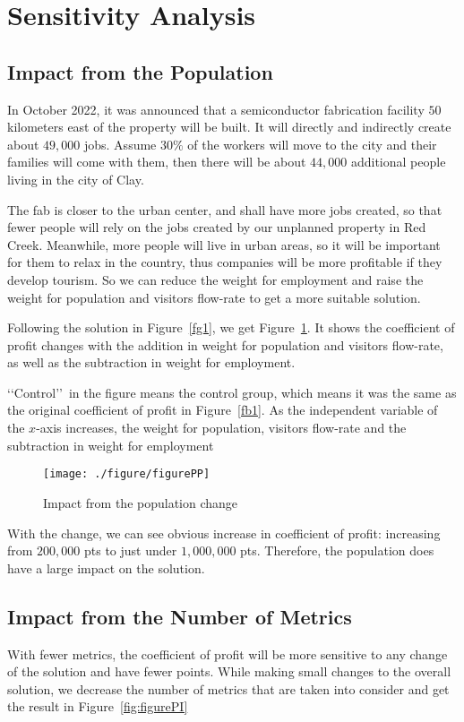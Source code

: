 \documentclass[./main.tex]{subfiles}
\begin{document}
    \section{Sensitivity Analysis}
    \subsection{Impact from the Population}
    In October 2022, it was announced that a semiconductor fabrication facility $50$ kilometers east of the property
    will be built.
    It will directly and indirectly create about $49,000$ jobs.
    Assume $30\%$ of the workers will move to the city and their families will come with them, then there will be
    about $44,
    000$ additional people living in the city of Clay.

    The fab is closer to the urban center, and shall have more jobs created, so that fewer people will rely on the
    jobs created by our unplanned property in Red Creek.
    Meanwhile, more people will live in urban areas, so it will be important for them to relax in the country, thus
    companies will be more profitable if they develop tourism.
    So we can reduce the weight for employment and raise the weight for population and visitors flow-rate to get a
    more suitable solution.

    Following the solution in Figure~\ref{fg1}, we get Figure~\ref{fig:figurePP}.
    It shows the coefficient of profit changes with the addition in weight for population and
    visitors flow-rate, as well as the subtraction in weight for employment.

    \lq\lq{Control}\rq\rq\ in the figure means the control group, which means it was the same as the original coefficient of profit in Figure~\ref{fb1}.
    As the independent variable of the $x$-axis increases, the weight for population, visitors flow-rate and the
    subtraction in weight for employment

    \begin{figure}[H]
        \centering
        \texttt{[image: ./figure/figurePP]}
        \caption{Impact from the population change}
        \label{fig:figurePP}
    \end{figure}

    With the change, we can see obvious increase in coefficient of profit: increasing from $200,000$ pts to just
    under $1,000,000$ pts.
    Therefore, the population does have a large impact on the solution.
    

    \subsection{Impact from the Number of Metrics}
    With fewer metrics, the coefficient of profit will be more sensitive to any change of the solution and have fewer
    points.
    While making small changes to the overall solution, we decrease the number of metrics that are taken into consider and
    get the result in Figure~\ref{fig:figurePI}
\end{document}
